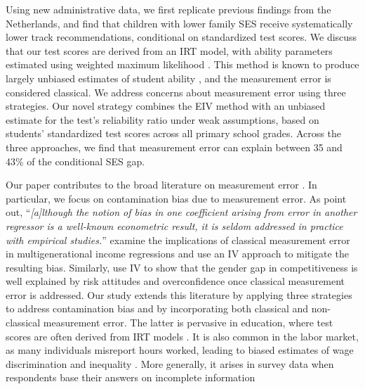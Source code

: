 Using new administrative data, we first replicate previous findings from the Netherlands, and find that children with lower family SES receive systematically lower track recommendations, conditional on standardized test scores. We discuss that our test scores are derived from an IRT model, with ability parameters estimated using weighted maximum likelihood \citep{sanders1993psychometrie}. This method is known to produce largely unbiased estimates of student ability \citep{warm1989weighted}, and the measurement error is considered classical. We address concerns about measurement error using three strategies. Our novel strategy combines the EIV method with an unbiased estimate for the test's reliability ratio under weak assumptions, based on students’ standardized test scores across all primary school grades. Across the three approaches, we find that measurement error can explain between 35 and 43\% of the conditional SES gap. 

Our paper contributes to the broad literature on measurement error \citep{schennach2016recent}. In particular, we focus on contamination bias due to measurement error. As \citet{modalsli2022spillover} point out,
%
``\textit{[a]lthough the notion of bias in one coefficient arising from error in another regressor is a well-known econometric result, it is seldom addressed in practice with empirical studies.}''
%
\citet{modalsli2022spillover} examine the implications of classical measurement error in multigenerational income regressions and use an IV approach to mitigate the resulting bias. Similarly, \citet{gillen2019experimenting} use IV to show that the gender gap in competitiveness is well explained by risk attitudes and overconfidence once classical measurement error is addressed. Our study extends this literature by applying three strategies to address contamination bias and by incorporating both classical and non-classical measurement error. The latter is pervasive in education, where test scores are often derived from IRT models \citep{jacob2016measurement}. 
It is also common in the labor market, as many individuals misreport hours worked, leading to biased estimates of wage discrimination and inequality \citep{borjas2024}. More generally, it arises in survey data when respondents base their answers on incomplete information \citep{hyslop2001bias}

